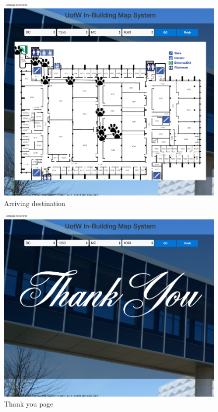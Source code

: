 \documentclass{sigchi}
\begin{document}
\begin{figure}[!h]
\centering
\includegraphics[width=1.0\columnwidth]{pics/map6.png}
\caption{Arriving destination}
\label{fig:map6}
\end{figure}

\begin{figure}[!h]
\centering
\includegraphics[width=1.0\columnwidth]{pics/map61.png}
\caption{Thank you page}
\label{fig:map61}
\end{figure}
\end{document}
